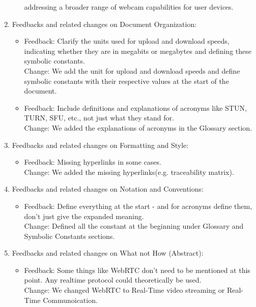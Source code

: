 \documentclass{article}
\begin{document}
\begin{enumerate}
\begin{itemize}
                addressing a broader range of webcam capabilities for user devices.
        \end{itemize}
    \item Feedbacks and related changes on Document Organization:
    \begin{itemize}
        \item Feedback: Clarify the units used for upload and download speeds, indicating whether they are in megabits or megabytes and defining these symbolic constants.\\
                Change: We add the unit for upload and download speeds and define symbolic constants with their respective values at the start of the document.
        \item Feedback: Include definitions and explanations of acronyms like STUN, TURN, SFU, etc., not just what they stand for.\\
                Change: We added the explanations of acronyms in the Glossary section.
    \end{itemize}
    \item Feedbacks and related changes on Formatting and Style:
    \begin{itemize}
        \item Feedback: Missing hyperlinks in some cases.\\
                Change: We added the missing hyperlinks(e.g. traceability matrix).
    \end{itemize}
    \item Feedbacks and related changes on Notation and Conventions:
    \begin{itemize}
        \item Feedback: Define everything at the start - and for acronyms define them, don't just give the expanded meaning.\\
                Change: Defined all the constant at the beginning under Glossary and Symbolic Constants sections.
    \end{itemize}
    \item Feedbacks and related changes on What not How (Abstract):
    \begin{itemize}
        \item Feedback: Some things like WebRTC don't need to be mentioned at this point. Any realtime protocol could theoretically be used.\\
                Change: We changed WebRTC to Real-Time video streaming or Real-Time Communoication.
    \end{itemize}

\end{enumerate}
\end{document}
